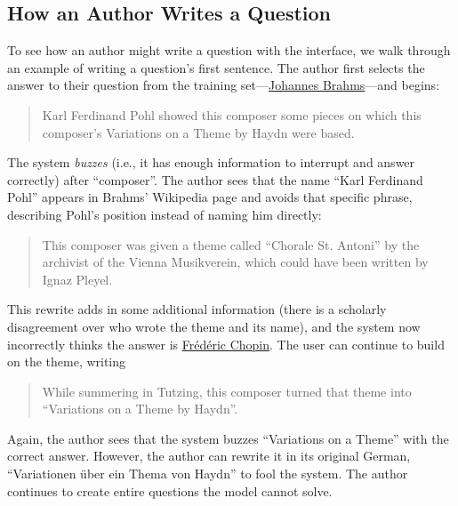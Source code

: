 \subsection{How an Author Writes a Question}

To see how an author might write a question with the interface, we walk
through an example of writing a question's first sentence. The
author first selects the answer to their question from the training
set---\underline{Johannes
Brahms}---and begins:
\begin{quote} Karl Ferdinand Pohl showed this composer some pieces on which
  this composer's Variations on a Theme by Haydn were based. \end{quote}
The  system \emph{buzzes} (i.e., it has enough information to
interrupt and answer correctly) after 
``composer''. The author sees that the name ``Karl
Ferdinand Pohl'' appears in Brahms' Wikipedia page and avoids
 that specific phrase, describing Pohl's
position instead of naming him directly:
\begin{quote} This composer was given a theme called ``Chorale St. Antoni'' by the
  archivist of the Vienna Musikverein, which could have been written
  by Ignaz Pleyel.\end{quote}
This rewrite adds in some additional information (there is a scholarly
disagreement over who wrote the theme and its name), and the  system now incorrectly thinks the answer is
\underline{Fr\'ed\'eric Chopin}.
The user can continue to build on the theme, writing \begin{quote}
   While summering in Tutzing, this composer turned that theme into
   ``Variations on a Theme by Haydn''.  \end{quote}
 Again, the author sees that the system buzzes ``Variations on a
 Theme'' with the correct answer.  However, the author can rewrite it
 in its original German, ``Variationen \"uber ein Thema von Haydn'' to
 fool the system.
 The author continues to
create entire questions the model cannot solve.
